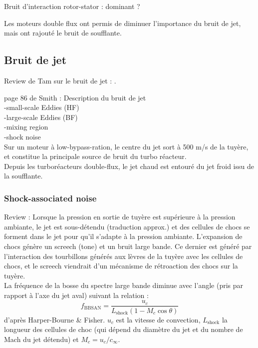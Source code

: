 Bruit d'interaction rotor-stator : dominant ?\\

Les moteurs double flux ont permis de diminuer l'importance du bruit de jet, mais ont rajouté le bruit de soufflante.


\subsection{Bruit de jet}
Review de Tam sur le bruit de jet : \cite{TamReviewJet}.

page 86 de Smith : Description du bruit de jet\\
-small-scale Eddies (HF)\\
-large-scale Eddies (BF)\\
-mixing region\\
-shock noise\\
Sur un moteur à low-bypass-ration, le centre du jet sort à 500 m/s de la tuyère, et constitue la principale source de bruit du turbo réacteur.\\
Depuis les turboréacteurs double-flux, le jet chaud est entouré du jet froid issu de la soufflante.\\


\subsubsection{Shock-associated noise}
Review : \cite{Bailly2014}
Lorsque la pression en sortie de tuyère est supérieure à la pression ambiante, le jet est sous-détendu (traduction approx.) et des cellules de chocs se forment dans le jet pour qu'il s'adapte à la pression ambiante.
L'expansion de chocs génère un screech (tone) et un bruit large bande. Ce dernier est généré par l'interaction des tourbillons générés aux lèvres de la tuyère avec les cellules de chocs, et le screech viendrait d'un mécanisme de rétroaction des chocs sur la tuyère.\\

La fréquence de la bosse du spectre large bande diminue avec l'angle (pris par rapport à l'axe du jet aval) suivant la relation : 
\begin{equation*}
	    f_{\text{BBSAN}} = \frac{u_c}{L_{\text{shock}}(1-M_c \cos \theta)}
\end{equation*}
d'après Harper-Bourne \& Fisher. 
$u_c$ est la vitesse de convection, $L_{\text{shock}}$ la longueur des cellules de choc (qui dépend du diamètre du jet et du nombre de Mach du jet détendu) et $M_c=u_c  / c_\infty$.\\

